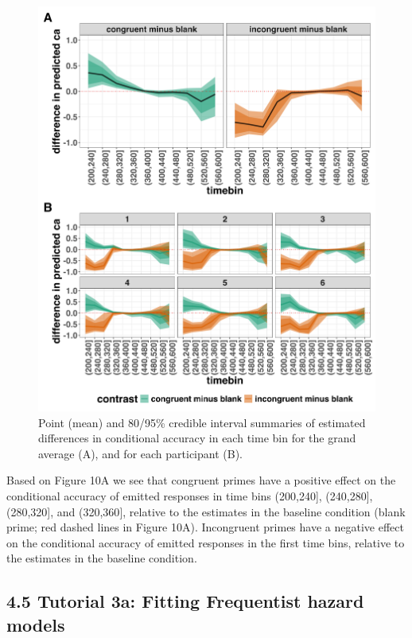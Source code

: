 \documentclass[
  man, donotrepeattitle,floatsintext]{apa6}
\begin{document}
\begin{figure}[H]

{\centering \includegraphics[width=0.8\linewidth,height=0.67\textheight,]{../Tutorial_2_Bayesian/figures/M1i_ca_ame_combined} 

}

\caption{Point (mean) and 80/95\% credible interval summaries of estimated differences in conditional accuracy in each time bin for the grand average (A), and for each participant (B).}\label{fig:plot-ca-grand-ame-effects}
\end{figure}

Based on Figure 10A we see that congruent primes have a positive effect on the conditional accuracy of emitted responses in time bins (200,240{]}, (240,280{]}, (280,320{]}, and (320,360{]}, relative to the estimates in the baseline condition (blank prime; red dashed lines in Figure 10A).
Incongruent primes have a negative effect on the conditional accuracy of emitted responses in the first time bins, relative to the estimates in the baseline condition.

\subsection{4.5 Tutorial 3a: Fitting Frequentist hazard models}\label{tutorial-3a-fitting-frequentist-hazard-models}
\end{document}
